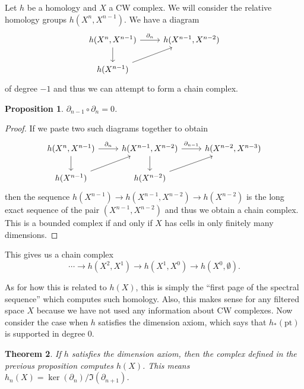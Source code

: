 \documentclass[leqno, openany]{memoir}
\newtheorem{thm}{Theorem}[section]
\newtheorem{prop}[thm]{Proposition}
\theoremstyle{definition}
\theoremstyle{remark}
\theoremstyle{plain}
\theoremstyle{definition}
\theoremstyle{remark}
\newcommand{\mr}[1]{\mathrm{#1}}
\begin{document}
Let $h$ be a homology and $X$ a CW complex. We will consider the relative homology groups $h(X^n, X^{n-1})$. We have a diagram
\begin{equation*}
\begin{tikzcd}
    h(X^n, X^{n-1}) \arrow{d} \arrow{r}{\partial_n} & h(X^{n-1}, X^{n-2}) \\
    h(X^{n-1}) \arrow{ur}
\end{tikzcd}
\end{equation*}
of degree $-1$ and thus we can attempt to form a chain complex.

\begin{prop}
    $\partial_{n-1} \circ \partial_n = 0$.
\end{prop}

\begin{proof}
    If we paste two such diagrams together to obtain
    \begin{equation*}
    \begin{tikzcd}
        h(X^n, X^{n-1}) \arrow{r}{\partial_n} \arrow{d} & h(X^{n-1}, X^{n-2}) \arrow{r}{\partial_{n-1}} \arrow{d} & h(X^{n-2}, X^{n-3}) \\
        h(X^{n-1}) \arrow{ur} & h(X^{n-2}) \arrow{ur}
    \end{tikzcd}
    \end{equation*}
    then the sequence $h(X^{n-1}) \to h(X^{n-1}, X^{n-2}) \to h(X^{n-2})$ is the long exact sequence of the pair $(X^{n-1}, X^{n-2})$ and thus we obtain a chain complex. This is a bounded complex if and only if $X$ has cells in only finitely many dimensions.
\end{proof}

This gives us a chain complex
\[ \cdots \to h(X^2, X^1) \to h(X^1, X^0) \to h(X^0, \emptyset). \]

As for how this is related to $h(X)$, this is simply the ``first page of the spectral sequence'' which computes such homology. Also, this makes sense for any filtered space $X$ because we have not used any information about CW complexes. Now consider the case when $h$ satisfies the dimension axiom, which says that $h_*(\mr{pt})$ is supported in degree $0$.

\begin{thm}
    If $h$ satisfies the dimension axiom, then the complex defined in the previous proposition computes $h(X)$. This means $h_n(X) = \ker(\partial_n) / \Im(\partial_{n+1})$.
\end{thm}
\end{document}
